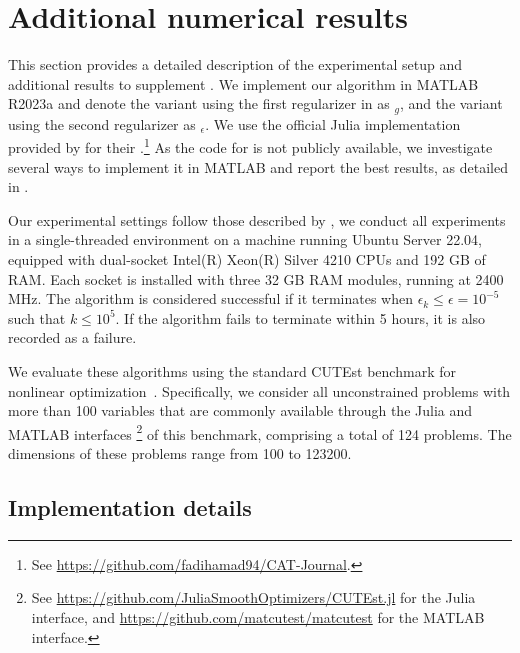 
\section{Additional numerical results} \label{sec:appendix/numerical-results}


This section provides a detailed description of the experimental setup and additional results to supplement .
We implement our algorithm in MATLAB R2023a 
and denote the variant using the first regularizer in  as $_g$,
and the variant using the second regularizer as $_\epsilon$. 
We use the official Julia implementation provided by \citet{hamad2024simple} for their .\footnote{See \url{https://github.com/fadihamad94/CAT-Journal}.}
As the code for  is not publicly available, we investigate several ways to implement it in MATLAB and report the best results, as detailed in .

Our experimental settings follow those described by \citet{hamad2024simple}, we conduct all experiments in a single-threaded environment on a machine running Ubuntu Server 22.04, equipped with dual-socket Intel(R) Xeon(R) Silver 4210 CPUs 
and 192 GB of RAM.
Each socket is installed with three 32 GB RAM modules, running at 2400 MHz.
The algorithm is considered successful if it terminates when $\epsilon_k \leq  \epsilon =  10^{-5}$ such that $k \leq 10^5$. If the algorithm fails to terminate within 5 hours, it is also recorded as a failure.

We evaluate these algorithms using the standard CUTEst benchmark for nonlinear optimization~\citep{gould2015cutest}.
Specifically, we consider all unconstrained problems with more than 100 variables that are commonly available through the Julia and MATLAB interfaces%
\footnote{See \url{https://github.com/JuliaSmoothOptimizers/CUTEst.jl} for the Julia interface, and \url{https://github.com/matcutest/matcutest} for the MATLAB interface.}
of this benchmark,
comprising a total of 124 problems.
The dimensions of these problems range from 100 to 123200.

\subsection{Implementation details} \label{sec:appendix/implementation-details}
